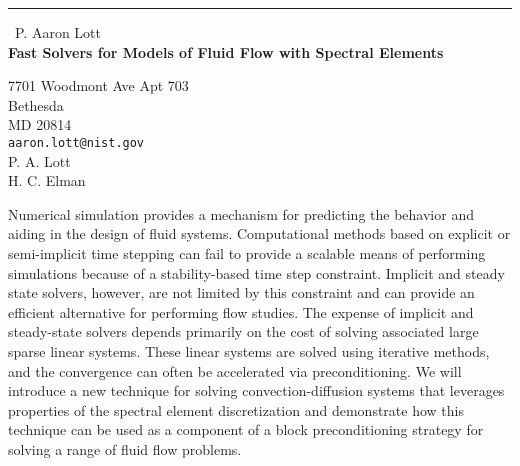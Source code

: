 \documentclass{report}
\begin{document}
\begin{center}
\rule{6in}{1pt} \
{\large P. Aaron Lott \\
{\bf Fast Solvers for Models of Fluid Flow with Spectral Elements}}

7701 Woodmont Ave Apt 703 \\ Bethesda \\ MD 20814
\\
{\tt aaron.lott@nist.gov}\\
P. A.  Lott\\
H. C. Elman\end{center}

Numerical simulation provides a mechanism for predicting the behavior and
aiding in the design of fluid systems. Computational methods based on
explicit or semi-implicit time stepping can fail to provide a scalable
means of performing simulations because of a stability-based time step
constraint. Implicit and steady state solvers, however, are not limited
by this constraint and can provide an efficient alternative for
performing flow studies. The expense of implicit and steady-state solvers
depends primarily on the cost of solving associated large sparse linear
systems. These linear systems are solved using iterative methods, and the
convergence can often be accelerated via preconditioning. We will
introduce a new technique for solving convection-diffusion systems that
leverages properties of the spectral element discretization and
demonstrate how this technique can be used as a component of a block
preconditioning strategy for solving a range of fluid flow problems.
\end{document}
